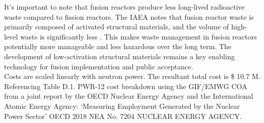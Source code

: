 It's important to note that fusion reactors produce less long-lived radioactive waste compared to fission reactors. The IAEA notes that fusion reactor waste is primarily composed of activated structural materials, and the volume of high-level waste is significantly less \cite{girard2008summary}. This makes waste management in fusion reactors potentially more manageable and less hazardous over the long term. The development of low-activation structural materials remains a key enabling technology for fusion implementation and public acceptance.\\

Costs are scaled linearly with neutron power. The resultant total cost is \$ 10.7 M. Referencing Table D.1. PWR-12 cost breakdown using the GIF/EMWG COA from a joint report by the OECD Nuclear Energy Agency and the International Atomic Energy Agency: `Measuring Employment Generated by the Nuclear Power Sector'  OECD 2018 NEA No. 7204 NUCLEAR ENERGY AGENCY.
